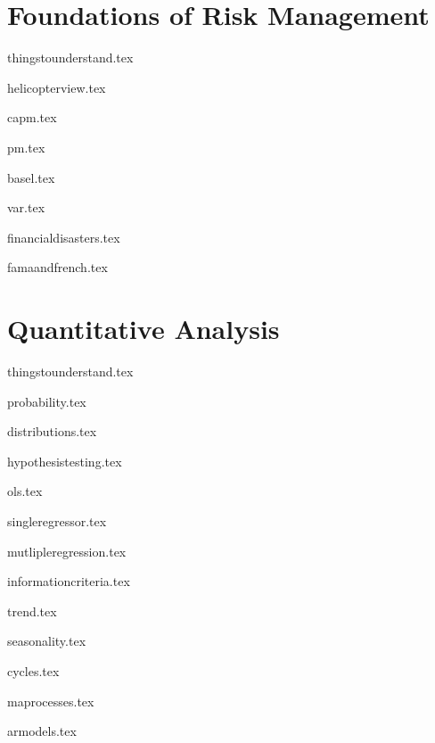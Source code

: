 \documentclass{report}
\begin{document}
	

\tableofcontents		

\part{Foundations of Risk Management}
\pagebreak

{thingstounderstand.tex}
\pagebreak

{helicopterview.tex}
\pagebreak

{capm.tex}
\pagebreak

{pm.tex}
\pagebreak

{basel.tex}
\pagebreak

{var.tex}
\pagebreak

{financialdisasters.tex}
\pagebreak

{famaandfrench.tex}
\pagebreak

\part{Quantitative Analysis}
{thingstounderstand.tex}
\pagebreak

{probability.tex}
\pagebreak

{distributions.tex}
\pagebreak

{hypothesistesting.tex}
\pagebreak

{ols.tex}
\pagebreak

{singleregressor.tex}
\pagebreak

{mutlipleregression.tex}
\pagebreak

{informationcriteria.tex}
\pagebreak

{trend.tex}
\pagebreak

{seasonality.tex}

{cycles.tex}
\pagebreak

{maprocesses.tex}
\pagebreak

{armodels.tex}
\pagebreak
\end{document}
